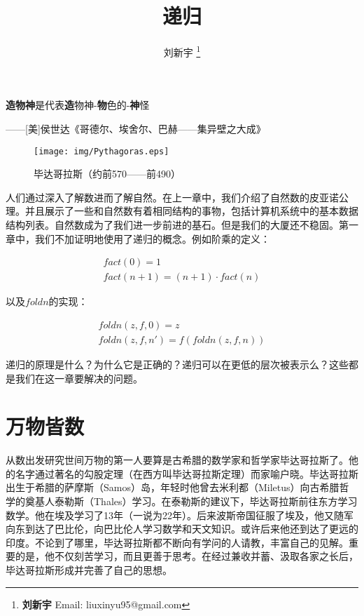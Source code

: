 \documentclass[UTF8]{article}
\begin{document}
\title{递归}

\author{刘新宇
\thanks{{\bfseries 刘新宇} \newline
  Email: liuxinyu95@gmail.com \newline}
  }

\maketitle
\fi


\epigraph{\textbf{造物神}是代表\textbf{造}物神-\textbf{物}色的-\textbf{神}怪}{——[美]侯世达《哥德尔、埃舍尔、巴赫——集异壁之大成》}

\begin{wrapfigure}{R}{0.3\textwidth}
 \centering
 \texttt{[image: img/Pythagoras.eps]}
 \captionsetup{labelformat=empty}
 \caption{毕达哥拉斯（约前570——前490）}
 \label{fig:Pythagoras}
\end{wrapfigure}

人们通过深入了解数进而了解自然。在上一章中，我们介绍了自然数的皮亚诺公理。并且展示了一些和自然数有着相同结构的事物，包括计算机系统中的基本数据结构列表。自然数成为了我们进一步前进的基石。但是我们的大厦还不稳固。第一章中，我们不加证明地使用了递归的概念。例如阶乘的定义：

\[
\begin{array}{l}
fact(0) = 1 \\
fact(n + 1) = (n + 1) \cdot fact(n)
\end{array}
\]

以及$foldn$的实现：

\[
\begin{array}{l}
foldn(z, f, 0) = z \\
foldn(z, f, n') = f(foldn(z, f, n))
\end{array}
\label{eq:foldn}
\]

递归的原理是什么？为什么它是正确的？递归可以在更低的层次被表示么？这些都是我们在这一章要解决的问题。

\section{万物皆数}

从数出发研究世间万物的第一人要算是古希腊的数学家和哲学家毕达哥拉斯了。他的名字通过著名的勾股定理（在西方叫毕达哥拉斯定理）而家喻户晓。毕达哥拉斯出生于希腊的萨摩斯（Samos）岛，年轻时他曾去米利都（Miletus）向古希腊哲学的奠基人泰勒斯（Thales）学习。在泰勒斯的建议下，毕达哥拉斯前往东方学习数学。他在埃及学习了13年（一说为22年）。后来波斯帝国征服了埃及，他又随军向东到达了巴比伦，向巴比伦人学习数学和天文知识。或许后来他还到达了更远的印度。不论到了哪里，毕达哥拉斯都不断向有学问的人请教，丰富自己的见解。重要的是，他不仅刻苦学习，而且更善于思考。在经过兼收并蓄、汲取各家之长后，毕达哥拉斯形成并完善了自己的思想\cite{HanXueTao16}。
\end{document}
